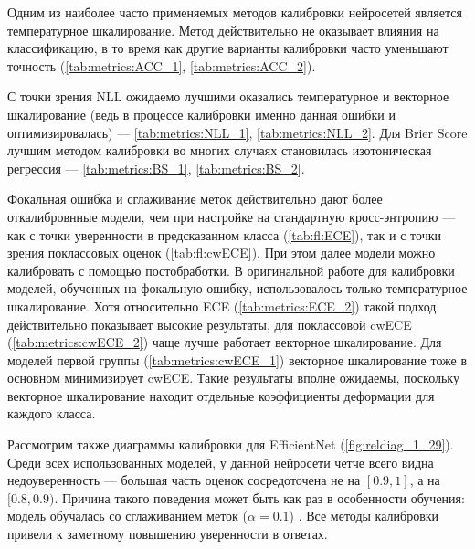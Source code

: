 \documentclass[12pt]{article}
\begin{document}
Одним из наиболее часто применяемых методов калибровки нейросетей является температурное шкалирование. Метод действительно не оказывает влияния на классификацию, в то время как другие варианты калибровки часто уменьшают точность (\autoref{tab:metrics:ACC_1}, \autoref{tab:metrics:ACC_2}). 

С точки зрения NLL ожидаемо лучшими оказались температурное и векторное шкалирование (ведь в процессе калибровки именно данная ошибки и оптимизировалась) --- \autoref{tab:metrics:NLL_1}, \autoref{tab:metrics:NLL_2}. Для Brier Score лучшим методом калибровки во многих случаях становилась изотоническая регрессия --- \autoref{tab:metrics:BS_1}, \autoref{tab:metrics:BS_2}. 

\begin{table}[h!]
    \begin{minipage}[h!]{0.47\textwidth}
        
    \end{minipage}\hfill
    \begin{minipage}[h!]{0.47\textwidth}
        
    \end{minipage}
\end{table}
Фокальная ошибка и сглаживание меток действительно дают более откалибровнные модели, чем при настройке на стандартную кросс-энтропию — как с точки уверенности в предсказанном класса (\autoref{tab:fl:ECE}), так и с точки зрения поклассовых оценок (\autoref{tab:fl:cwECE}). При этом далее модели можно калибровать с помощью постобработки. В оригинальной работе \cite{focal_calib} для калибровки моделей, обученных на фокальную ошибку, использовалось только температурное шкалирование. Хотя относительно ECE (\autoref{tab:metrics:ECE_2}) такой подход действительно показывает высокие результаты, для поклассовой cwECE (\autoref{tab:metrics:cwECE_2}) чаще лучше работает векторное шкалирование. Для моделей первой группы (\autoref{tab:metrics:cwECE_1}) векторное шкалирование тоже в основном минимизирует cwECE. Такие результаты вполне ожидаемы, поскольку векторное шкалирование находит отдельные коэффициенты деформации для каждого класса.

Рассмотрим также диаграммы калибровки для EfficientNet (\autoref{fig:reldiag_1_29}). Среди всех использованных моделей, у данной нейросети четче всего видна недоуверенность --- большая часть оценок сосредоточена не на $[0.9, 1]$, а на $[0.8, 0.9)$. Причина такого поведения может быть как раз в особенности обучения: модель обучалась со сглаживанием меток ($\alpha=0.1$) \cite{pretrained_imagenet}. Все методы калибровки привели к заметному повышению уверенности в ответах.
\end{document}
